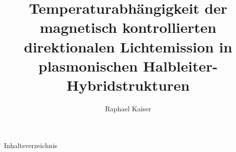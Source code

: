 \documentclass[aspectratio=1610, 9pt]{beamer}
\title{Temperaturabhängigkeit der
magnetisch kontrollierten direktionalen
Lichtemission in plasmonischen
Halbleiter-Hybridstrukturen}
\author[R.~Kaiser]{Raphael Kaiser}
\institute[Experimentelle Physik II]{Experimentelle Physik II \\ Fakultät Physik}
\begin{document}
\maketitle

\begin{frame}{Inhaltsverzeichnis}
  \tableofcontents
\end{frame}




%

\end{document}
